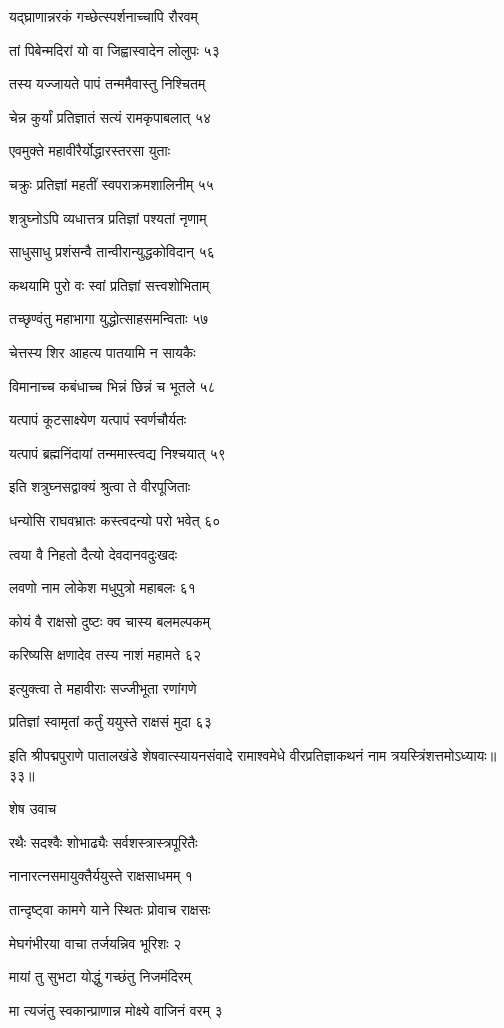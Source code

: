 यद्घ्राणान्नरकं गच्छेत्स्पर्शनाच्चापि रौरवम्

तां पिबेन्मदिरां यो वा जिह्वास्वादेन लोलुपः ५३

तस्य यज्जायते पापं तन्ममैवास्तु निश्चितम्

चेन्न कुर्यां प्रतिज्ञातं सत्यं रामकृपाबलात् ५४

एवमुक्ते महावीरैर्योद्धारस्तरसा युताः

चक्रुः प्रतिज्ञां महतीं स्वपराक्रमशालिनीम् ५५

शत्रुघ्नोऽपि व्यधात्तत्र प्रतिज्ञां पश्यतां नृणाम्

साधुसाधु प्रशंसन्वै तान्वीरान्युद्धकोविदान् ५६

कथयामि पुरो वः स्वां प्रतिज्ञां सत्त्वशोभिताम्

तच्छृण्वंतु महाभागा युद्धोत्साहसमन्विताः ५७

चेत्तस्य शिर आहत्य पातयामि न सायकैः

विमानाच्च कबंधाच्च भिन्नं छिन्नं च भूतले ५८

यत्पापं कूटसाक्ष्येण यत्पापं स्वर्णचौर्यतः

यत्पापं ब्रह्मनिंदायां तन्ममास्त्वद्य निश्चयात् ५९

इति शत्रुघ्नसद्वाक्यं श्रुत्वा ते वीरपूजिताः

धन्योसि राघवभ्रातः कस्त्वदन्यो परो भवेत् ६०

त्वया वै निहतो दैत्यो देवदानवदुःखदः

लवणो नाम लोकेश मधुपुत्रो महाबलः ६१

कोयं वै राक्षसो दुष्टः क्व चास्य बलमल्पकम्

करिष्यसि क्षणादेव तस्य नाशं महामते ६२

इत्युक्त्वा ते महावीराः सज्जीभूता रणांगणे

प्रतिज्ञां स्वामृतां कर्तुं ययुस्ते राक्षसं मुदा ६३

इति श्रीपद्मपुराणे पातालखंडे शेषवात्स्यायनसंवादे रामाश्वमेधे वीरप्रतिज्ञाकथनं नाम त्रयस्त्रिंशत्तमोऽध्यायः॥३३॥


शेष उवाच

रथैः सदश्वैः शोभाढ्यैः सर्वशस्त्रास्त्रपूरितैः

नानारत्नसमायुक्तैर्ययुस्ते राक्षसाधमम् १

तान्दृष्ट्वा कामगे याने स्थितः प्रोवाच राक्षसः

मेघगंभीरया वाचा तर्जयन्निव भूरिशः २

मायां तु सुभटा योद्धुं गच्छंतु निजमंदिरम्

मा त्यजंतु स्वकान्प्राणान्न मोक्ष्ये वाजिनं वरम् ३

